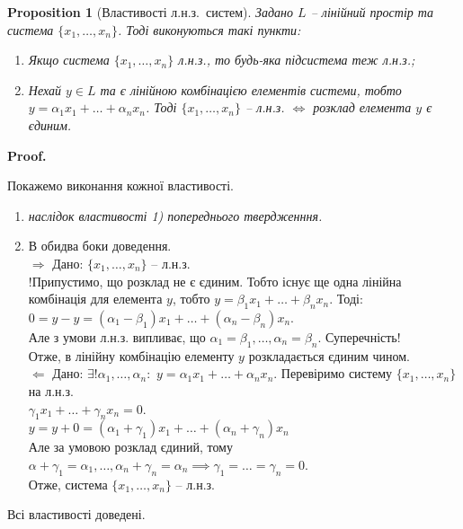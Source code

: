\documentclass[a4paper, 10pt]{article}
\makeatletter
\def\rightproof{$\boxed{\Rightarrow}$ }
\def\leftproof{$\boxed{\Leftarrow}$ }
\theoremstyle{theoremdd}
\newtheorem{proposition}[theorem]{Proposition}
\renewenvironment{proof}[1][Proof.\\]{\par
\pushQED{\hfill \qed}%
\normalfont \topsep6\p@\@plus6\p@\relax
\trivlist
\item\relax
{\bfseries
#1\@addpunct{.}}\hspace\labelsep\ignorespaces
}{%
\popQED\endtrivlist\@endpefalse
}
\makeatother
\begin{document}
	\begin{proposition}[Властивості л.н.з.\ систем]
	Задано $L$ -- лінійний простір та система $\{x_1,\dots,x_n\}$. Тоді виконуються такі пункти:
	\begin{enumerate}[nosep, wide = 0pt, label={\arabic*)}]
	\item Якщо система $\{x_1, \dots, x_n\}$ л.н.з., то будь-яка підсистема теж л.н.з.;
	\item Нехай $y \in L$ та є лінійною комбінацією елементів системи, тобто $y = \alpha_1 x_1 + \dots + \alpha_n x_n$. Тоді $\{x_1, \dots, x_n\}$ -- л.н.з. $\iff$ розклад елемента $y$ є єдиним.
	\end{enumerate}
	\end{proposition}
	
	\begin{proof}
	Покажемо виконання кожної властивості.
	\begin{enumerate}[topsep=-\parskip, wide=0pt, label={\arabic*)}]
	\item \textit{наслідок властивості 1) попереднього твердженння.}
	\item В обидва боки доведення.\\
	\rightproof Дано: $\{x_1, \dots, x_n \}$ -- л.н.з.\\
	!Припустимо, що розклад не є єдиним. Тобто існує ще одна лінійна комбінація для елемента $y$, тобто $y = \beta_1 x_1 + \dots + \beta_n x_n$. Тоді:\\
	$0 = y - y = (\alpha_1 - \beta_1)x_1 + \dots + (\alpha_n - \beta_n)x_n$.\\
	Але з умови л.н.з. випливає, що $\alpha_1 = \beta_1, \dots, \alpha_n = \beta_n$. Суперечність! \\ 
	Отже, в лінійну комбінацію елементу $y$ розкладається єдиним чином.
	\bigskip \\
	\leftproof Дано: $\exists! \alpha_1, \dots, \alpha_n:$
	$y = \alpha_1 x_1 + \dots + \alpha_n x_n$. Перевіримо систему $\{x_1, \dots, x_n\}$ на л.н.з.\\
	$\gamma_1 x_1 + \dots + \gamma_n x_n = 0$.\\
	$y = y + 0 = (\alpha_1 + \gamma_1)x_1 + \dots + (\alpha_n + \gamma_n)x_n$\\
	Але за умовою розклад єдиний, тому $\alpha + \gamma_1 = \alpha_1, \dots, \alpha_n + \gamma_n = \alpha_n \implies \gamma_1 = \dots = \gamma_n = 0$.\\
	Отже, система $\{x_1,\dots,x_n\}$ -- л.н.з.
	\end{enumerate}
	Всі властивості доведені.
	\end{proof}
	
\end{document}
